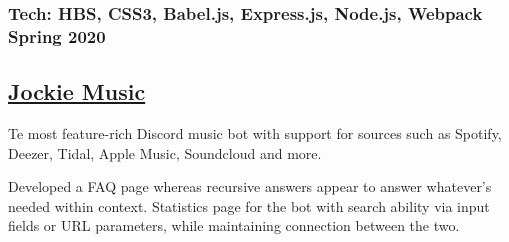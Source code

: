 \subsubsection*{
  Tech: HBS, CSS3, Babel.js, Express.js, Node.js, Webpack
  \hspace*{\fill}
  Spring 2020
}
\subsection*{
  \href{https://bumbleboss.xyz/w/jockiemusic}{Jockie Music}
}
Te most feature-rich Discord music bot with support for sources such as Spotify, Deezer, Tidal, Apple Music, Soundcloud and more.
\begin{tasks}
  \task Developed a FAQ page whereas recursive answers appear to answer whatever's needed within context.
  \task Statistics page for the bot with search ability via input fields or URL parameters, while maintaining connection between the two.
\end{tasks}